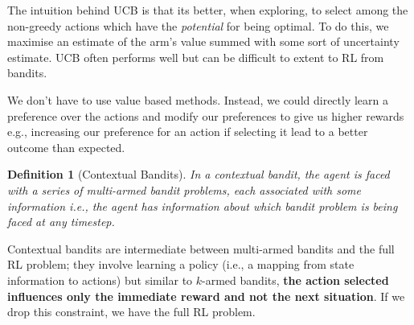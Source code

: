 \documentclass{article}
\newtheorem{definition}{Definition}[section]
\newcommand{\ix}[1]{%
  \leavevmode %
  \marginpar{\small\emph{#1}}%
}
\begin{document}
The\ix{UCB} intuition behind UCB is that its better, when exploring, to select among the non-greedy actions which have the \emph{potential} for being optimal. To do this, we maximise an estimate of the arm's value summed with some sort of uncertainty estimate. UCB often performs well but can be difficult to extent to RL from bandits. 

We don't have to use value based methods. Instead, we could directly learn a preference over the actions and modify our preferences to give us higher rewards e.g., increasing our preference for an action if selecting it lead to a better outcome than expected. 

\begin{definition}[Contextual Bandits]
	In\ix{Contextual Bandits} a contextual bandit, the agent is faced with a series of multi-armed bandit problems, each associated with some information i.e., the agent has information about which bandit problem is being faced at any timestep. 
\end{definition}
Contextual bandits are intermediate between multi-armed bandits and the full RL problem; they involve learning a policy (i.e., a mapping from state information to actions) but similar to $k$-armed bandits, \textbf{the action selected influences only the immediate reward and not the next situation}. If we drop this constraint, we have the full RL problem. 
\end{document}
